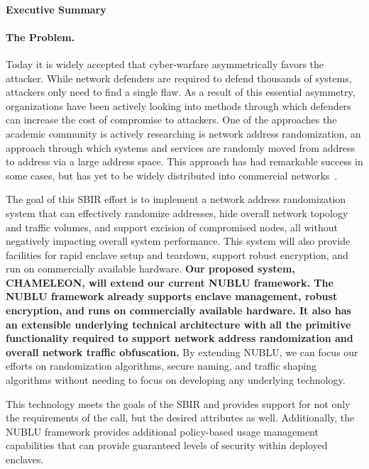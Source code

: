 \documentclass{sbir}
\begin{document}
\paragraph{Executive Summary}
\paragraph{The Problem.} 
Today it is widely accepted that cyber-warfare asymmetrically favors the attacker.  While network defenders are required to defend thousands of systems, attackers only need to find a single flaw. As a result of this essential asymmetry, organizations have been actively looking into methods through which defenders can increase the cost of compromise to attackers. One of the approaches the academic community is actively researching is network address randomization, an approach through which systems and services are randomly moved from address to address via a large address space. This approach has had remarkable success in some cases, but has yet to be widely distributed into commercial networks~\cite{AnAkPe:07}.

\vspace*{-0.05in}
The goal of this SBIR effort is to implement a network address randomization system that can effectively randomize addresses, hide overall network topology and traffic volumes, and support excision of compromised nodes, all without negatively impacting overall system performance. This system will also provide facilities for rapid enclave setup and teardown, support robust encryption, and run on commercially available hardware. {\bf Our proposed system, CHAMELEON, will extend our current NUBLU framework.  The NUBLU framework already supports enclave management, robust encryption, and runs on commercially available hardware. It also has an extensible underlying technical architecture with all the primitive functionality required to support network address randomization and overall network traffic obfuscation.} By extending NUBLU, we can focus our efforts on randomization algorithms, secure naming, and traffic shaping algorithms without needing to focus on developing any underlying technology. 

\vspace*{-0.05in}
This technology meets the goals of the SBIR and provides support for not only the requirements of the call, but the desired attributes as well.  Additionally, the NUBLU framework provides additional policy-based usage management capabilities that can provide guaranteed levels of security within deployed enclaves.
\end{document}
